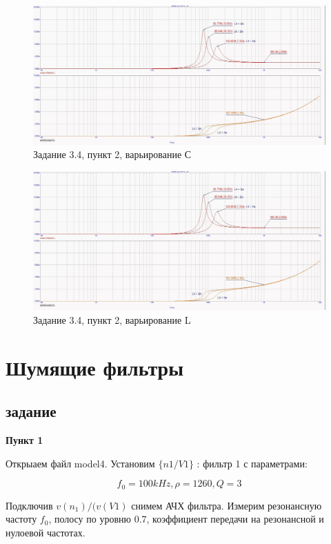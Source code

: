 \documentclass[a4paper, 14pt]{extarticle}%
\begin{document}
\begin{figure}[h!]
			\centering
			\includegraphics[width=1.1\linewidth]{3/3_4_2.jpg}
			\caption{Задание 3.4, пункт 2, варьирование С}
			\label{A}
\end{figure}


\begin{figure}[h!]
			\centering
			\includegraphics[width=1.1\linewidth]{3/3_4_2.jpg}
			\caption{Задание 3.4, пункт 2, варьирование L}
			\label{A}
\end{figure}




\newpage

\section{Шумящие фильтры}

\subsection{задание}
\textbf{Пункт 1}

Открыаем файл model4.
Установим $\{n1/V1\}$ : фильтр 1 с параметрами:


\[ f_0 = 100kHz, \rho = 1260, Q = 3\]


Подключив $v(n_1)/(v(V1)$ снимем АЧХ фильтра. Измерим резонансную частоту $f_0$, полосу по уровню 0.7, коэффициент передачи на резонансной и нулоевой частотах.
\end{document}
